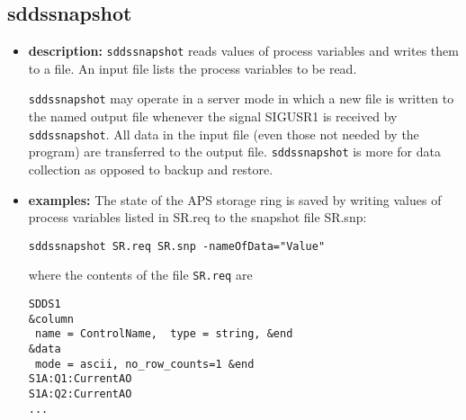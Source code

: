 %
%
\begin{latexonly}
\newpage
\end{latexonly}

%
%
\subsection{sddssnapshot}
\label{sddssnapshot}

\begin{itemize}
\item {\bf description:}
%
%
\verb+sddssnapshot+ reads values of process variables and writes them to a file.
An input file lists the process variables to be read.

\verb+sddssnapshot+ may operate in a server mode in which a new file is written to the named output file whenever the signal SIGUSR1 is received
by \verb+sddssnapshot+.
All data in the input file (even those not needed by the program) are transferred to the output file.
\verb+sddssnapshot+ is more for data collection as opposed to backup and restore.

\item {\bf examples:}
%
% 
%
The state of the APS storage ring is saved by writing 
values of process variables listed in SR.req
to the snapshot file SR.snp:
\begin{verbatim}
sddssnapshot SR.req SR.snp -nameOfData="Value"
\end{verbatim}
where the contents of the file \verb+SR.req+ are
\begin{verbatim}
SDDS1
&column
 name = ControlName,  type = string, &end
&data
 mode = ascii, no_row_counts=1 &end
S1A:Q1:CurrentAO
S1A:Q2:CurrentAO
...
\end{verbatim}


\end{itemize}
